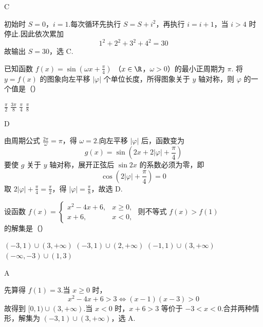 \begin{answer}
C
\end{answer}

\begin{solution}
初始时 \(S=0\)，\(i=1\).每次循环先执行 \(S=S+i^2\)，再执行 \(i=i+1\)，当 \(i>4\) 时停止.因此依次累加
\[
1^2+2^2+3^2+4^2=30
\]
故输出 \(S=30\)，选 C.
\end{solution}

\begin{problem}
已知函数 \( f(x) = \sin \left( \omega x + \frac{\pi}{4} \right) \) （\(x \in \R\)，\(\omega > 0\)）的最小正周期为 \(\pi\). 将 \( y = f(x) \) 的图象向左平移 \( \left| \varphi \right| \) 个单位长度，所得图象关于 \( y \) 轴对称，则 \( \varphi \) 的一个值是（\quad）

\choices
    {\( \frac{\pi}{2} \)}
    {\(\frac{3\pi}{8}\)}
    {\(\frac{\pi}{4}\)}
    {\(\frac{\pi}{8}\)}
\end{problem}

\begin{answer}
D
\end{answer}

\begin{solution}
由周期公式 \(\frac{2\pi}{\omega}=\pi\)，得 \(\omega=2\).向左平移 \(\left|\varphi\right|\) 后，函数变为
\[
g(x)=\sin\left(2x+2\left|\varphi\right|+\frac{\pi}{4}\right)
\]
要使 \(g\) 关于 \(y\) 轴对称，展开正弦后 \(\sin 2x\) 的系数必须为零，即
\[
\cos\left(2\left|\varphi\right|+\frac{\pi}{4}\right)=0
\]
取 \(2\left|\varphi\right|+\frac{\pi}{4}=\frac{\pi}{2}\)，得 \(\left|\varphi\right|=\frac{\pi}{8}\)，故选 D.
\end{solution}

\begin{problem}
设函数 \( f(x) = \begin{cases}
x^2 - 4x + 6, & x \geqslant 0,\\
x + 6, & x < 0,
\end{cases} \) 则不等式 \( f(x) > f(1) \) 的解集是（\quad）

\choices
    {\((-3,1)\cup (3, + \infty)\)}
    {\((-3,1)\cup (2, + \infty)\)}
    {\((-1, 1) \cup (3, +\infty)\)}
    {\((-\infty, -3) \cup (1, 3)\)}
\end{problem}

\begin{answer}
A
\end{answer}

\begin{solution}
先算得 \(f(1)=3\).当 \(x\geqslant0\) 时，
\[
x^2-4x+6>3\Longleftrightarrow (x-1)(x-3)>0
\]
故得到 \([0,1)\cup(3,+\infty)\).当 \(x<0\) 时，\(x+6>3\) 等价于 \(-3<x<0\).合并两种情形，解集为 \((-3,1)\cup(3,+\infty)\)，选 A.
\end{solution}

